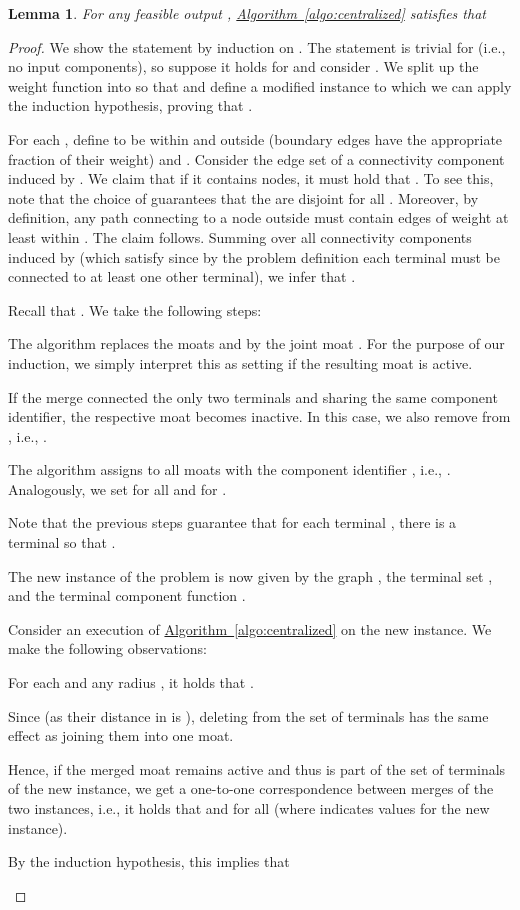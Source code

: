 \documentclass[letterpaper,11pt]{article}
\newtheorem{lemma}[theorem]{Lemma}
\newcommand{\namedref}[2]{\hyperref[#2]{#1~\ref*{#2}}}
\newcommand{\algref}[1]{\namedref{Algorithm}{#1}}
\begin{document}
\begin{lemma}\label{lemma:cost} 
For any feasible output , \algref{algo:centralized} satisfies that

\end{lemma}
\begin{proof}
We show the statement by induction on . The statement is trivial for
 (i.e., no input components), so suppose it holds for
 and consider . We split up the weight function
 into  so that  and define a modified
instance to which we can apply the induction hypothesis, proving that .

For each , define  to be  within  and  outside (boundary edges have the appropriate fraction of
their weight) and . Consider the edge set  of a connectivity
component  induced by . We claim that if it contains  nodes, it must hold that . To see this, note that the
choice of  guarantees that the  are disjoint for all
. Moreover, by definition, any path connecting  to a node
outside  must contain edges of weight at least  within
. The claim follows. Summing over all connectivity components
 induced by  (which satisfy  since by the problem
definition each terminal must be connected to at least one other terminal), we
infer that .

Recall that . We take the following steps:
\begin{compactitem}
  \item The algorithm replaces the moats  and  by the
  joint moat . For the purpose of our induction, we simply
  interpret this as setting  if the resulting moat is
  active.
  \item If the merge connected the only two terminals  and  sharing
  the same component identifier, the respective moat becomes inactive. In this
  case, we also remove  from , i.e., .
  \item The algorithm assigns to all moats  with
   the component identifier , i.e.,
  . Analogously, we set 
  for all  and
   for .
  \item Note that the previous steps guarantee that for each terminal ,
  there is a terminal  so that .
  \item The new instance of the problem is now given by the graph
  , the terminal set , and the terminal component function
  .
\end{compactitem}
Consider an execution of \algref{algo:centralized} on the new instance. We make
the following observations:
\begin{compactitem}
  \item For each  and any radius , it holds that
  . 
  \item Since  (as their distance in  is ),
  deleting  from the set of terminals has the same effect as joining them
  into one moat.
  \item Hence, if the merged moat  remains active and thus  is
  part of the set of terminals of the new instance, we get a one-to-one
  correspondence between merges of the two instances, i.e., it holds that
   and  for all  (where  indicates values for the new instance).
  \item By the induction hypothesis, this implies that
  

\end{compactitem}
\end{proof}
\end{document}
